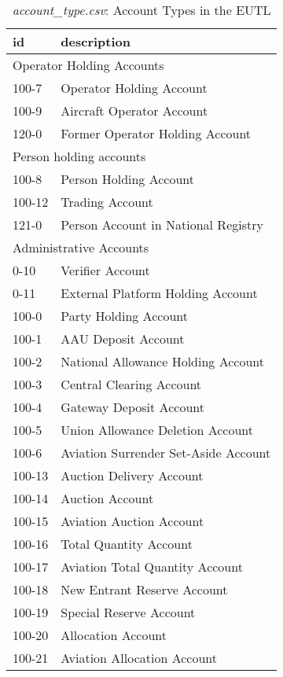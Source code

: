 \documentclass[authoryear]{elsarticle}
\begin{document}
\begin{table}[htbp]\scriptsize
	\caption{\textit{account\_type.csv}: Account Types in the EUTL}\label{tab:accountTypes}
	\centering
	\begin{tabular*}{\textwidth}{@{}@{\extracolsep{\fill}} ll @{}}
		\toprule
		\toprule
		\textbf{id} & \textbf{description}  \\
		\midrule
		\multicolumn{2}{l}{Operator Holding Accounts} \\
		\midrule
		100-7 & Operator Holding Account \\
		100-9 & Aircraft Operator Account \\
		120-0 & Former Operator Holding Account \\
		\midrule
		\multicolumn{2}{l}{Person holding accounts} \\
		\midrule
		100-8 & Person Holding Account \\
		100-12 & Trading Account \\
		121-0 & Person Account in National Registry \\
		\midrule
		\multicolumn{2}{l}{Administrative Accounts} \\
		\midrule
		0-10  & Verifier Account \\
		0-11  & External Platform Holding Account \\
		100-0 & Party Holding Account \\
		100-1 & AAU Deposit Account \\
		100-2 & National Allowance Holding Account \\
		100-3 & Central Clearing Account \\
		100-4 & Gateway Deposit Account \\
		100-5 & Union Allowance Deletion Account \\
		100-6 & Aviation Surrender Set-Aside Account \\
		100-13 & Auction Delivery Account \\
		100-14 & Auction Account \\
		100-15 & Aviation Auction Account \\
		100-16 & Total Quantity Account \\
		100-17 & Aviation Total Quantity Account \\
		100-18 & New Entrant Reserve Account \\
		100-19 & Special Reserve Account \\
		100-20 & Allocation Account \\
		100-21 & Aviation Allocation Account \\

\end{tabular*}
\end{table}
\end{document}
